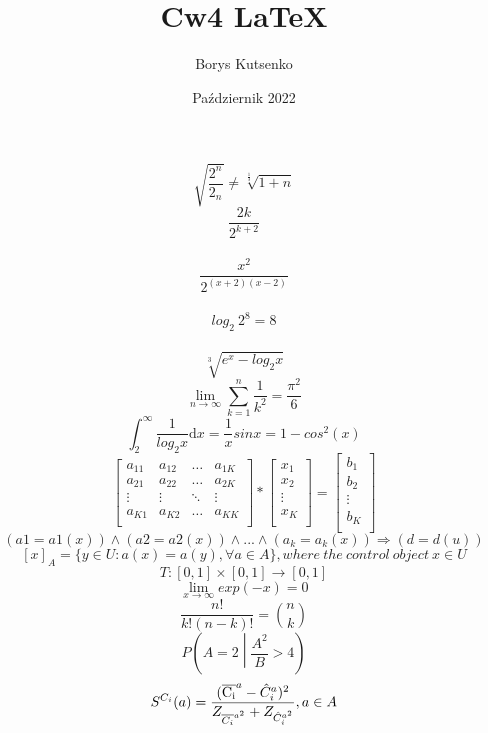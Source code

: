\documentclass[12pt, letterpaper, titlepage]{article}
\title{Cw4 LaTeX}
\author{Borys Kutsenko}
\date{Październik 2022}
\begin{document}
$$ \sqrt{ \frac{2^{n}}{2_n}} \neq \sqrt[\frac{1}{3}]{1+n} $$
$$ \frac{2k}{2^{k+2}} $$\\
$$ \frac{x^2}{2^{(x+2)(x-2)}} $$\\
$$ log_2\ 2^8=8$$\\
$$ \sqrt[{3}]{e^x-log_2x} $$
$$ \lim_{n \rightarrow \infty} \sum_{k=1}^{n}\frac{1}{k^2} = \frac{\pi^2}{6} $$
$$\int_{2}^\infty \frac{1}{log_2x} \mathrm{d} x = \frac{1}{x} sinx = 1 - cos^2(x)$$
$$\mathbf{}
\left[ \begin{array}{cccc}
a_{11} & a_{12} & \ldots & a_{1K} \\
a_{21} & a_{22} & \ldots & a_{2K}\\
\vdots & \vdots & \ddots & \vdots\\
a_{K1} & a_{K2} & \ldots & a_{KK}\\
\end{array} \right] * \mathbf{}
\left[ \begin{array}{c}
x_{1} \\
x_{2} \\
\vdots \\
x_{K} \\
\end{array} \right] = 
\left[ \begin{array}{c}
b_{1} \\
b_{2} \\
\vdots \\
b_{K} \\
\end{array} \right] $$
$$ (a1=a1(x))\wedge (a2=a2(x))\wedge  ...  \wedge(a_k=a_k(x)) \Rightarrow (d=d(u)) $$
$$[x]_A=\{y\in U: a(x) = a(y),\forall a \in A \}, where\ the\ control\ object\ x \in U$$
$$T: [0,1] \times [0,1] \rightarrow [0,1]  $$
$$\lim_{x \rightarrow \infty} exp(-x) = 0$$
$$ \frac{n!}{k!(n-k)!} =  {n \choose k} $$
$$ P\left(A=2\middle |\frac{A^2}{B} > 4\right) $$
$$ S^{C_i} (a) = \frac{(\overline{\rm C_i}^a - \hat{C}_i^a)^2}{Z_{\overline{ C_i}^{a^2}} + Z_{\hat{C}_i^{a^2}}}, a \in A $$
\end{document}

